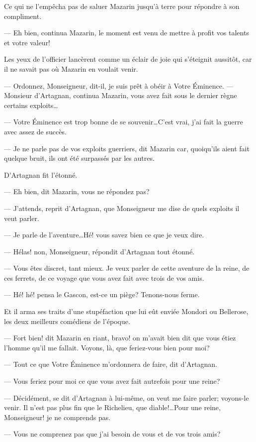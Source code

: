 Ce qui ne l'empêcha pas de saluer Mazarin jusqu'à terre pour répondre à son compliment.

— Eh bien, continua Mazarin, le moment est venu de mettre à profit vos talents et votre valeur!

Les yeux de l'officier lancèrent comme un éclair de joie qui s'éteignit aussitôt, car il ne savait pas où Mazarin en voulait venir.

— Ordonnez, Monseigneur, dit-il, je suis prêt à obéir à Votre Éminence.
— Monsieur d'Artagnan, continua Mazarin, vous avez fait sous le dernier règne certains exploits\dots

— Votre Éminence est trop bonne de se souvenir\dots C'est vrai, j'ai fait la guerre avec assez de succès.

— Je ne parle pas de vos exploits guerriers, dit Mazarin car, quoiqu'ils aient fait quelque bruit, ils ont été surpassés par les autres.

D'Artagnan fit l'étonné.

— Eh bien, dit Mazarin, vous ne répondez pas?

— J'attends, reprit d'Artagnan, que Monseigneur me dise de quels exploits il veut parler.

— Je parle de l'aventure\dots Hé! vous savez bien ce que je veux dire.

— Hélas! non, Monseigneur, répondit d'Artagnan tout étonné.

— Vous êtes discret, tant mieux. Je veux parler de cette aventure de la reine, de ces ferrets, de ce voyage que vous avez fait avec trois de vos amis.

— Hé! hé! pensa le Gascon, est-ce un piège? Tenons-nous ferme.

Et il arma ses traits d'une stupéfaction que lui eût enviée Mondori ou Bellerose, les deux meilleurs comédiens de l'époque.

— Fort bien! dit Mazarin en riant, bravo! on m'avait bien dit que vous étiez l'homme qu'il me fallait. Voyons, là, que feriez-vous bien pour moi?

— Tout ce que Votre Éminence m'ordonnera de faire, dit d'Artagnan.

— Vous feriez pour moi ce que vous avez fait autrefois pour une reine?

— Décidément, se dit d'Artagnan à lui-même, on veut me faire parler; voyons-le venir. Il n'est pas plus fin que le Richelieu, que diable!\dots Pour une reine, Monseigneur! je ne comprends pas.

— Vous ne comprenez pas que j'ai besoin de vous et de vos trois amis?

